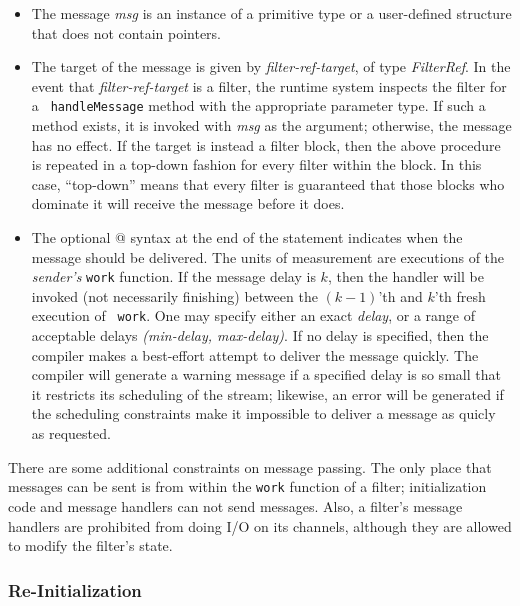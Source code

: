 \begin{itemize}

\item The message {\it msg} is an instance of a primitive type or a
user-defined structure that does not contain pointers.

\item The target of the message is given by {\it filter-ref-target},
of type {\it FilterRef}.  In the event that {\it filter-ref-target} is
a filter, the runtime system inspects the filter for a {\tt
handleMessage} method with the appropriate parameter type.  If such a
method exists, it is invoked with {\it msg} as the argument;
otherwise, the message has no effect.  If the target is instead a
filter block, then the above procedure is repeated in a top-down
fashion for every filter within the block.  In this case, ``top-down''
means that every filter is guaranteed that those blocks who dominate
it will receive the message before it does.

\item The optional @ syntax at the end of the statement indicates when
the message should be delivered.  The units of measurement are
executions of the {\it sender's} {\tt work} function.  If the message
delay is $k$, then the handler will be invoked (not necessarily
finishing) between the $(k-1)$'th and $k$'th fresh execution of {\tt
work}.  One may specify either an exact {\it delay}, or a range of
acceptable delays {\it (min-delay, max-delay)}.  If no delay is
specified, then the compiler makes a best-effort attempt to deliver
the message quickly.  The compiler will generate a warning message if
a specified delay is so small that it restricts its scheduling of the
stream; likewise, an error will be generated if the scheduling
constraints make it impossible to deliver a message as quicly as
requested.

\end{itemize}

There are some additional constraints on message passing.  The only
place that messages can be sent is from within the {\tt work} function
of a filter; initialization code and message handlers can not send
messages.  Also, a filter's message handlers are prohibited from doing
I/O on its channels, although they are allowed to modify the filter's
state.

\subsubsection{Re-Initialization}

